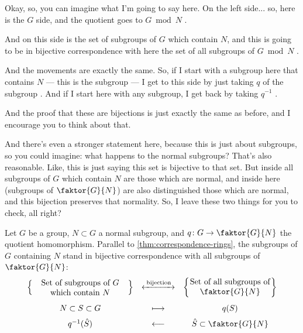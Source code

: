 \begin{speech}[00:16:41 - 00:18:22]
Okay, so, you can imagine what I'm going to say here. On the left side... so, here is the $G$ side, and the quotient goes to $G \bmod N$ .

And on this side is the set of subgroups of $G$ which contain $N$, and this is going to be in bijective correspondence with here the set of all subgroups of $G \bmod N$ .

And the movements are exactly the same. So, if I start with a subgroup here that contains $N$ --- this is the subgroup --- I get to this side by just taking $q$ of the subgroup . And if I start here with any subgroup, I get back by taking $q^{-1}$ .

And the proof that these are bijections is just exactly the same as before, and I encourage you to think about that.

And there's even a stronger statement here, because this is just about subgroups, so you could imagine: what happens to the normal subgroups? That's also reasonable. Like, this is just saying this set is bijective to that set. But inside all subgroups of $G$ which contain $N$ are those which are normal, and inside here (subgroups of $\faktor{G}{N}$) are also distinguished those which are normal, and this bijection preserves that normality. So, I leave these two things for you to check, all right?
\end{speech}

\begin{content}
Let $G$ be a group, $N \subset G$ a normal subgroup, and $q \colon G \to \faktor{G}{N}$ the quotient homomorphism. Parallel to \cref{thm:correspondence-rings}, the subgroups of $G$ containing $N$ stand in bijective correspondence with all subgroups of $\faktor{G}{N}$:
\[
\begin{array}{ccc}
\left\{ \parbox{4.1cm}{\centering Set of subgroups of $G$ which contain $N$} \right\}
& \xleftrightarrow{\;\text{bijection}\;} &
\left\{ \parbox{3.5cm}{\centering Set of all subgroups of $\faktor{G}{N}$} \right\} \\[1.4em]
N \subset S \subset G & \longmapsto & q(S) \\[0.6em]
q^{-1}(\hat{S}) & \longleftarrow & \hat{S} \subset \faktor{G}{N}
\end{array}
\]
\end{content}

